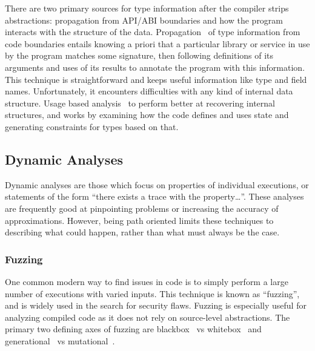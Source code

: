 There are two primary sources for type information after the compiler strips abstractions: propagation from API/ABI boundaries and how the program interacts with the structure of the data.
Propagation~\cite{howard} of type information from code boundaries entails knowing a priori that a particular library or service in use by the program matches some signature, then following definitions of its arguments and uses of its results to annotate the program with this information.
This technique is straightforward and keeps useful information like type and field names. 
Unfortunately, it encounters difficulties with any kind of internal data structure.
Usage based analysis~\cite{tie,bitr} to perform better at recovering internal structures, and works by examining how the code defines and uses state and generating constraints for types based on that.



\subsection{Dynamic Analyses}
Dynamic analyses are those which focus on properties of individual executions, or statements of the form ``there exists a trace with the property\ldots''.
These analyses are frequently good at pinpointing problems or increasing the accuracy of approximations.
However, being path oriented limits these techniques to describing what could happen, rather than what must always be the case.

\subsubsection{Fuzzing}
One common modern way to find issues in code is to simply perform a large number of executions with varied inputs.
This technique is known as ``fuzzing'', and is widely used in the search for security flaws.
Fuzzing is especially useful for analyzing compiled code as it does not rely on source-level abstractions.
The primary two defining axes of fuzzing are blackbox~\cite{peach,zzuf,rebert2014} vs whitebox~\cite{klee,godefroid2008,avgerinos2014} and generational~\cite{peach} vs mutational~\cite{zzuf}.

